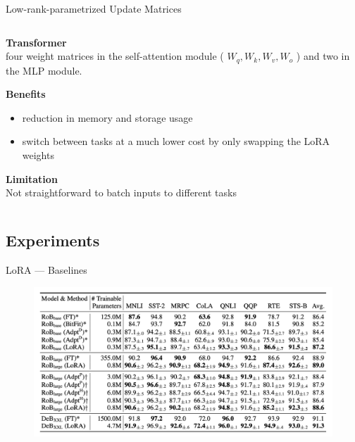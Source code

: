 \documentclass[aspectratio=169,xcolor=dvipsnames]{beamer}
\begin{document}
\begin{frame}{Low-rank-parametrized Update Matrices}
\begin{columns}
\begin{column}{0.7\textwidth}
             \textbf{Transformer} \\
            four weight matrices in the self-attention module ( $W_{q}, W_{k}, W_{v}, W_{o}$ ) and two in the MLP module. \\
            \bigskip
            
            \textbf{Benefits}\\
            \begin{itemize}
                \item reduction in memory and storage usage
                \item switch between tasks at a much lower cost by only swapping the LoRA weights
            \end{itemize}
            \bigskip    
            
            \textbf{Limitation}\\
            Not straightforward to batch inputs to different tasks
        \end{column}
    \end{columns}
\end{frame}



\subsection{Experiments}

\begin{frame}{LoRA --- Baselines}
    \begin{figure}
        \centering
        \label{LoRA_baselines}
        \includegraphics[width=0.8 \linewidth]{figures/baselines.png}
    \end{figure}  
\end{frame}

\end{document}
